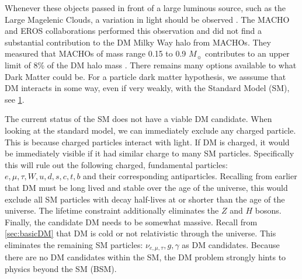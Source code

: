 Whenever these objects passed in front of a large luminous source, such as the Large Magelenic Clouds, a variation in light should be observed \cite{Hooper:DMHistory}.
The MACHO and EROS collaborations performed this observation and did not find a substantial contribution to the DM Milky Way halo from MACHOs.
They measured that MACHOs of mass range 0.15 to 0.9 $M_{\sun}$ contributes to an upper limit of 8\% of the DM halo mass \cite{Tisserand:MACHO}.
There remains many options available to what Dark Matter could be.
For a particle dark matter hypothesis, we asssume that DM interacts in some way, even if very weakly, with the Standard Model (SM), see \cref{fig:SM}.
\begin{figure}[ht]
    \label{fig:SM}
\end{figure}
The current status of the SM does not have a viable DM candidate.
When looking at the standard model, we can immediately exclude any charged particle.
This is because charged particles interact with light.
If DM is charged, it would be immediately visible if it had similar charge to many SM particles.
Specifically this will rule out the following charged, fundamental particles: $e,\mu, \tau, W, u, d, s, c, t, b$ and their corresponding antiparticles.
Recalling from earlier that DM must be long lived and stable over the age of the universe, this would exclude all SM particles with decay half-lives at or shorter than the age of the universe.
The lifetime constraint additionally eliminates the $Z$ and $H$ bosons.
Finally, the candidate DM needs to be somewhat massive.
Recall from \cref{sec:basicDM} that DM is cold or not relativistic through the universe.
This eliminates the remaining SM particles: $\nu_{e, \mu, \tau}, g, \gamma$ as DM candidates.
Because there are no DM candidates within the SM, the DM problem strongly hints to physics beyond the SM (BSM).


